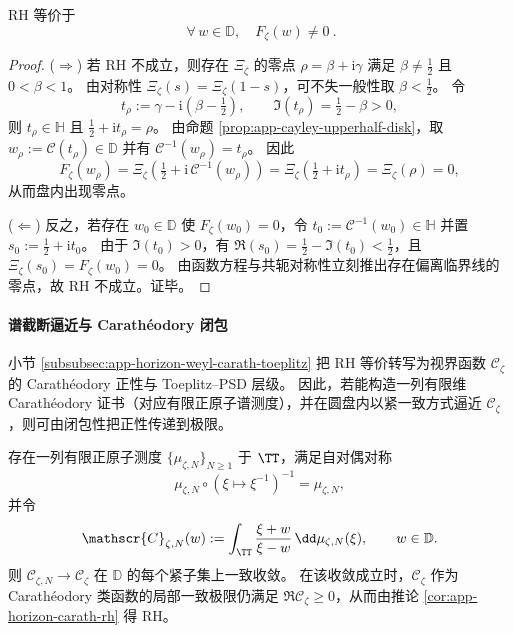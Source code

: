 \begin{theorem}\label{thm:app-rh-iff-disk-zero-free}
RH 等价于
\[
\boxed{\ \forall\,w\in\mathbb{D},\quad F_{\zeta}(w)\neq 0\ }.
\]
\end{theorem}
\begin{proof}
(\(\Rightarrow\)) 若 RH 不成立，则存在 \(\Xi_{\zeta}\) 的零点 \(\rho=\beta+\mathrm{i}\gamma\) 满足 \(\beta\neq \tfrac12\) 且 \(0<\beta<1\)。
由对称性 \(\Xi_{\zeta}(s)=\Xi_{\zeta}(1-s)\)，可不失一般性取 \(\beta<\tfrac12\)。
令
\[
t_{\rho}:=\gamma-\mathrm{i}\left(\beta-\tfrac12\right),
\qquad
\Im(t_{\rho})=\tfrac12-\beta>0,
\]
则 \(t_{\rho}\in\mathbb{H}\) 且 \( \tfrac12+\mathrm{i}t_{\rho}=\rho\)。
由命题 \ref{prop:app-cayley-upperhalf-disk}，取 \(w_{\rho}:=\mathcal{C}(t_{\rho})\in\mathbb{D}\) 并有 \(\mathcal{C}^{-1}(w_{\rho})=t_{\rho}\)。
因此
\[
F_{\zeta}(w_{\rho})
=\Xi_{\zeta}\!\left(\tfrac12+\mathrm{i}\,\mathcal{C}^{-1}(w_{\rho})\right)
=\Xi_{\zeta}\!\left(\tfrac12+\mathrm{i}t_{\rho}\right)
=\Xi_{\zeta}(\rho)
=0,
\]
从而盘内出现零点。

(\(\Leftarrow\)) 反之，若存在 \(w_0\in\mathbb{D}\) 使 \(F_{\zeta}(w_0)=0\)，令 \(t_0:=\mathcal{C}^{-1}(w_0)\in\mathbb{H}\) 并置 \(s_0:=\tfrac12+\mathrm{i}t_0\)。
由于 \(\Im(t_0)>0\)，有 \(\Re(s_0)=\tfrac12-\Im(t_0)<\tfrac12\)，且
\(
\Xi_{\zeta}(s_0)=F_{\zeta}(w_0)=0
\)。
由函数方程与共轭对称性立刻推出存在偏离临界线的零点，故 RH 不成立。证毕。
\end{proof}



\paragraph{谱截断逼近与 Carath\'eodory 闭包}
小节 \ref{subsubsec:app-horizon-weyl-carath-toeplitz} 把 RH 等价转写为视界函数 \(\mathscr{C}_{\zeta}\) 的 Carath\'eodory 正性与 Toeplitz--PSD 层级。
因此，若能构造一列有限维 Carath\'eodory 证书（对应有限正原子谱测度），并在圆盘内以紧一致方式逼近 \(\mathscr{C}_{\zeta}\)，则可由闭包性把正性传递到极限。

\begin{conjecture}\label{conj:app-horizon-truncated-carath-convergence}
存在一列有限正原子测度 \(\{\mu_{\zeta,N}\}_{N\ge 1}\) 于 \(\TT\)，满足自对偶对称
\[
\mu_{\zeta,N}\circ(\xi\mapsto \xi^{-1})^{-1}=\mu_{\zeta,N},
\]
并令
\begin{equation}\label{eq:app-horizon-carath-trunc}
\mathscr{C}_{\zeta,N}(w):=\int_{\TT}\frac{\xi+w}{\xi-w}\,\dd\mu_{\zeta,N}(\xi),
\qquad w\in\mathbb{D}.
\end{equation}
则 \(\mathscr{C}_{\zeta,N}\to \mathscr{C}_{\zeta}\) 在 \(\mathbb{D}\) 的每个紧子集上一致收敛。
在该收敛成立时，\(\mathscr{C}_{\zeta}\) 作为 Carath\'eodory 类函数的局部一致极限仍满足 \(\Re \mathscr{C}_{\zeta}\ge 0\)，从而由推论 \ref{cor:app-horizon-carath-rh} 得 RH。
\end{conjecture}

